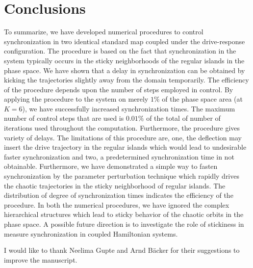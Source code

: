 \documentclass[reprint,superscriptaddress,amsmath,amssymb,aps,pre]{revtex4-1}
\begin{document}
\section{Conclusions}
\label{sec:conclusions}
To summarize, we have developed numerical procedures to control 
synchronization in two identical standard map coupled under the drive-response 
configuration. The procedure is based on the fact that synchronization in the 
system typically occurs in the sticky neighborhoods of the regular islands in 
the phase space. We have shown that a delay in synchronization can be obtained 
by kicking the trajectories slightly away from the domain temporarily. The 
efficiency of the procedure depends upon the number of steps employed in 
control. By applying the procedure to the system on merely $1\%$ of the phase 
space area (at $K = 6$), we have successfully increased synchronization times. 
The maximum number of control steps that are used is $0.01\%$ of the total of 
number of iterations used throughout the computation.  Furthermore, the 
procedure gives variety of delays. The limitations of this procedure are, one, 
the deflection may insert the drive trajectory in the regular islands which 
would lead to undesirable faster synchronization and two, a predetermined 
synchronization time in not obtainable. Furthermore, we have demonstrated a 
simple way to fasten synchronization by the parameter perturbation technique 
which rapidly drives the chaotic trajectories in the sticky neighborhood of 
regular islands. The distribution of degree of synchronization times indicates 
the efficiency of the procedure. In both the numerical procedures, we have 
ignored the complex hierarchical structures which lead to sticky 
behavior of the chaotic orbits in the phase space. A possible future direction 
is to investigate the role of stickiness in measure synchronization in coupled 
Hamiltonian systems.

\begin{acknowledgments}
I would like to thank Neelima Gupte and Arnd B\"acker for their suggestions to improve the manuscript. 
\end{acknowledgments}




\appendix


%
%
%
%
%




\end{document}
